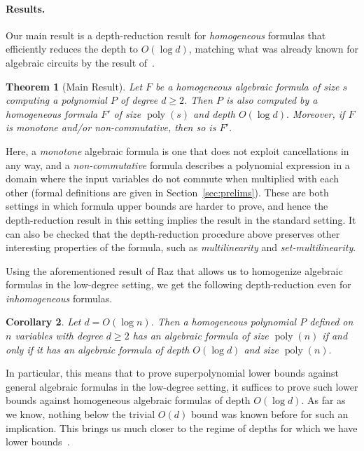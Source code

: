 \documentclass[11pt,a4paper]{article}
\newtheorem{theorem}{Theorem}
\newtheorem{corollary}[theorem]{Corollary}
\newcommand{\poly}{\mathop{\mathrm{poly}}}
\begin{document}
\paragraph{Results.} Our main result is a depth-reduction result for {\em homogeneous} formulas that efficiently reduces the depth to $O(\log d)$, matching what was already known for algebraic circuits by the result of~\cite{VSBR}. 

\begin{theorem}[Main Result]
\label{thm:main-intro}
Let $F$ be a homogeneous algebraic formula of size $s$ computing a polynomial $P$ of degree $d \geq 2$. Then $P$ is also computed by a homogeneous formula $F'$ of size $\poly(s)$ and depth $O(\log d).$ Moreover, if $F$ is monotone and/or non-commutative, then so is $F'$.
\end{theorem}

Here, a \emph{monotone} algebraic formula is one that does not exploit cancellations in any way, and a \emph{non-commutative} formula describes a polynomial expression in a domain where the input variables do not commute when multiplied with each other (formal definitions are given in Section~\ref{sec:prelims}). These are both settings in which formula upper bounds are harder to prove, and hence the depth-reduction result in this setting implies the result in the standard setting.
It can also be checked that the depth-reduction procedure above preserves other interesting properties of the formula, such as \emph{multilinearity} and \emph{set-multilinearity}.

Using the aforementioned result of Raz that allows us to homogenize algebraic formulas in the low-degree setting, we get the following depth-reduction even for \emph{inhomogeneous} formulas.

\begin{corollary}
\label{cor:inhom}
Let $d = O(\log n)$. Then a homogeneous polynomial $P$ defined on $n$ variables with degree $d \geq 2$ has an algebraic formula of size $\poly(n)$ if and only if it has an algebraic formula of depth $O(\log d)$ and size $\poly(n).$
\end{corollary}

In particular, this means that to prove superpolynomial lower bounds against general algebraic formulas in the low-degree setting, it suffices to prove such lower bounds against homogeneous algebraic formulas of depth $O(\log d).$ As far as we know, nothing below the trivial $O(d)$ bound was known before for such an implication. This brings us much closer to the regime of depths for which we have lower bounds~\cite{LST-FOCS}.
\end{document}
